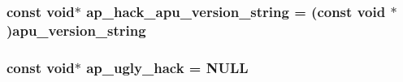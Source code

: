 \subsubsection[{\texorpdfstring{ap\+\_\+hack\+\_\+apu\+\_\+version\+\_\+string}{ap_hack_apu_version_string}}]{\setlength{\rightskip}{0pt plus 5cm}const {\bf void}$\ast$ ap\+\_\+hack\+\_\+apu\+\_\+version\+\_\+string = (const {\bf void} $\ast$)apu\+\_\+version\+\_\+string}\hypertarget{srclib_2apr-util_2exports_8c_ab8f918464104fc14d1c54da2b75952b3}{}\label{srclib_2apr-util_2exports_8c_ab8f918464104fc14d1c54da2b75952b3}
\subsubsection[{\texorpdfstring{ap\+\_\+ugly\+\_\+hack}{ap_ugly_hack}}]{\setlength{\rightskip}{0pt plus 5cm}const {\bf void}$\ast$ ap\+\_\+ugly\+\_\+hack = {\bf N\+U\+LL}}\hypertarget{srclib_2apr-util_2exports_8c_a609db801a1be5cfe0aabaac731cc46e6}{}\label{srclib_2apr-util_2exports_8c_a609db801a1be5cfe0aabaac731cc46e6}
